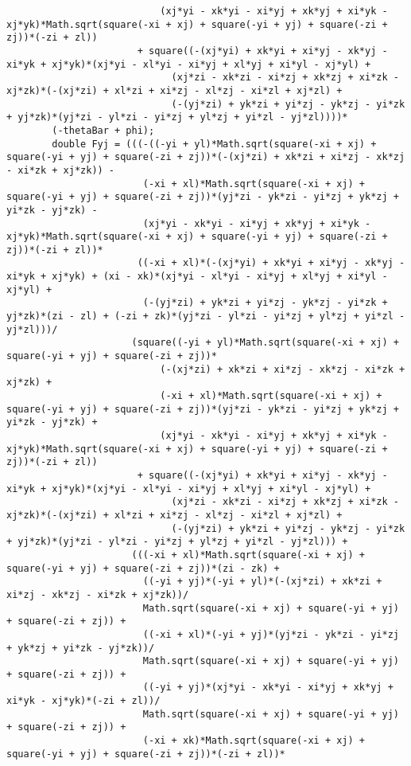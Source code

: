 \begin{lstlisting}
						   (xj*yi - xk*yi - xi*yj + xk*yj + xi*yk - xj*yk)*Math.sqrt(square(-xi + xj) + square(-yi + yj) + square(-zi + zj))*(-zi + zl))
					   + square((-(xj*yi) + xk*yi + xi*yj - xk*yj - xi*yk + xj*yk)*(xj*yi - xl*yi - xi*yj + xl*yj + xi*yl - xj*yl) + 
							 (xj*zi - xk*zi - xi*zj + xk*zj + xi*zk - xj*zk)*(-(xj*zi) + xl*zi + xi*zj - xl*zj - xi*zl + xj*zl) + 
							 (-(yj*zi) + yk*zi + yi*zj - yk*zj - yi*zk + yj*zk)*(yj*zi - yl*zi - yi*zj + yl*zj + yi*zl - yj*zl))))*
		(-thetaBar + phi);
		double Fyj = (((-((-yi + yl)*Math.sqrt(square(-xi + xj) + square(-yi + yj) + square(-zi + zj))*(-(xj*zi) + xk*zi + xi*zj - xk*zj - xi*zk + xj*zk)) - 
						(-xi + xl)*Math.sqrt(square(-xi + xj) + square(-yi + yj) + square(-zi + zj))*(yj*zi - yk*zi - yi*zj + yk*zj + yi*zk - yj*zk) - 
						(xj*yi - xk*yi - xi*yj + xk*yj + xi*yk - xj*yk)*Math.sqrt(square(-xi + xj) + square(-yi + yj) + square(-zi + zj))*(-zi + zl))*
					   ((-xi + xl)*(-(xj*yi) + xk*yi + xi*yj - xk*yj - xi*yk + xj*yk) + (xi - xk)*(xj*yi - xl*yi - xi*yj + xl*yj + xi*yl - xj*yl) + 
						(-(yj*zi) + yk*zi + yi*zj - yk*zj - yi*zk + yj*zk)*(zi - zl) + (-zi + zk)*(yj*zi - yl*zi - yi*zj + yl*zj + yi*zl - yj*zl)))/
					  (square((-yi + yl)*Math.sqrt(square(-xi + xj) + square(-yi + yj) + square(-zi + zj))*
						   (-(xj*zi) + xk*zi + xi*zj - xk*zj - xi*zk + xj*zk) + 
						   (-xi + xl)*Math.sqrt(square(-xi + xj) + square(-yi + yj) + square(-zi + zj))*(yj*zi - yk*zi - yi*zj + yk*zj + yi*zk - yj*zk) + 
						   (xj*yi - xk*yi - xi*yj + xk*yj + xi*yk - xj*yk)*Math.sqrt(square(-xi + xj) + square(-yi + yj) + square(-zi + zj))*(-zi + zl))
					   + square((-(xj*yi) + xk*yi + xi*yj - xk*yj - xi*yk + xj*yk)*(xj*yi - xl*yi - xi*yj + xl*yj + xi*yl - xj*yl) + 
							 (xj*zi - xk*zi - xi*zj + xk*zj + xi*zk - xj*zk)*(-(xj*zi) + xl*zi + xi*zj - xl*zj - xi*zl + xj*zl) + 
							 (-(yj*zi) + yk*zi + yi*zj - yk*zj - yi*zk + yj*zk)*(yj*zi - yl*zi - yi*zj + yl*zj + yi*zl - yj*zl))) + 
					  (((-xi + xl)*Math.sqrt(square(-xi + xj) + square(-yi + yj) + square(-zi + zj))*(zi - zk) + 
						((-yi + yj)*(-yi + yl)*(-(xj*zi) + xk*zi + xi*zj - xk*zj - xi*zk + xj*zk))/
						Math.sqrt(square(-xi + xj) + square(-yi + yj) + square(-zi + zj)) + 
						((-xi + xl)*(-yi + yj)*(yj*zi - yk*zi - yi*zj + yk*zj + yi*zk - yj*zk))/
						Math.sqrt(square(-xi + xj) + square(-yi + yj) + square(-zi + zj)) + 
						((-yi + yj)*(xj*yi - xk*yi - xi*yj + xk*yj + xi*yk - xj*yk)*(-zi + zl))/
						Math.sqrt(square(-xi + xj) + square(-yi + yj) + square(-zi + zj)) + 
						(-xi + xk)*Math.sqrt(square(-xi + xj) + square(-yi + yj) + square(-zi + zj))*(-zi + zl))*

\end{lstlisting}
